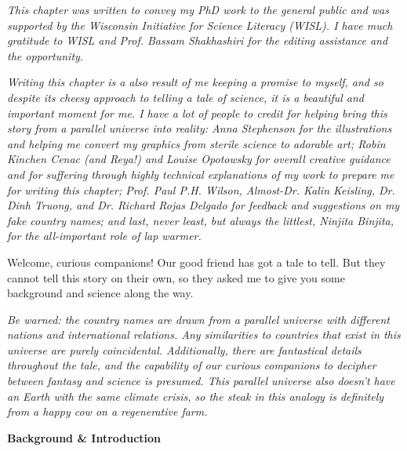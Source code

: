 {
\setlength{\parindent}{0pt}
\setlength{\parskip}{1em}

\begin{quoting}
  {
  \footnotesize
  
  \textit{This chapter was written to convey my PhD work to the general public
  and was supported by the Wisconsin Initiative for Science Literacy (WISL).  I
  have much gratitude to WISL and Prof. Bassam Shakhashiri for the editing
  assistance and the opportunity.}
  
  \textit{Writing this chapter is a also result of me keeping a promise to
  myself, and so despite its cheesy approach to telling a tale of science, it
  is a beautiful and important moment for me. I have a lot of people to credit
  for helping bring this story from a parallel universe into reality: Anna
  Stephenson for the illustrations and helping me convert my graphics from
  sterile science to adorable art; Robin Kinchen Cenac (and Reya!) and Louise
  Opotowsky for overall creative guidance and for suffering through highly
  technical explanations of my work to prepare me for writing this chapter;
  Prof. Paul P.H. Wilson, Almost-Dr.  Kalin Keisling, Dr. Dinh Truong, and Dr.
  Richard Rojas Delgado for feedback and suggestions on my fake country names;
  and last, never least, but always the littlest, Ninjita Binjita, for the
  all-important role of lap warmer.} 
  
  }
\end{quoting}

\narr Welcome, curious companions! Our good friend has got a tale to tell.  But
they cannot tell this story on their own, so they asked me to give you some
background and science along the way.

\textit{Be warned: the country names are drawn from a parallel universe with
different nations and international relations. Any similarities to countries
that exist in this universe are purely coincidental. Additionally, there are
fantastical details throughout the tale, and the capability of our curious
companions to decipher between fantasy and science is presumed.  This parallel
universe also doesn't have an Earth with the same climate crisis, so the steak
in this analogy is definitely from a happy cow on a regenerative farm.}

\begin{tcolorbox}[halign=center]
\textbf{Background \& Introduction}
\end{tcolorbox}

}
